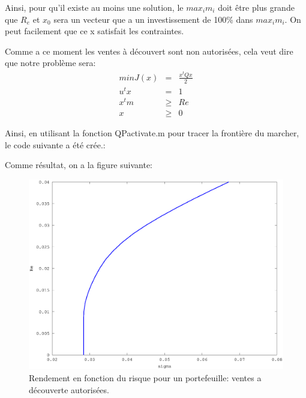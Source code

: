 \documentclass[a4paper,11pt]{article}
\begin{document}
Ainsi, pour  qu'il existe au  moins une solution,  le $max_i m_i$ doit  être plus
grande que $R_e$ et $x_0$ sera un  vecteur que a un investissement de 100\% dans
$max_i m_i$. On peut facilement que ce x  satisfait les contraintes.

Comme a ce moment les ventes à découvert sont non autorisées, cela veut dire que
notre problème sera:
\begin{eqnarray*}
min J(x)&=& \frac{x^tQx}{2}\\
u^tx&=&1\\
x^tm&\geq&Re\\
x&\geq&0
\end{eqnarray*}

Ainsi, en utilisant la fonction QPactivate.m pour tracer la frontière du marcher, le code suivante a été crée.:

\begin{multicols}{2}
  
\end{multicols}
Comme résultat, on a la figure suivante:

\begin{figure}[h!]
  \begin{centering}
    \includegraphics[scale=0.4]{parte14.eps}
    \par\end{centering}
  \caption{Rendement  en  fonction du  risque  pour  un  portefeuille: ventes  a
    découverte autorisées.}
  \label{fig:jacobi-conv}
\end{figure}


\end{document}
